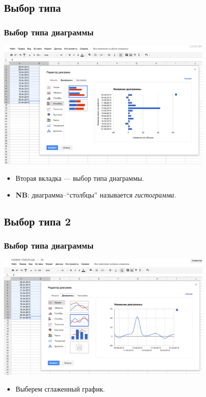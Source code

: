 \documentclass[compress,red]{beamer}
\begin{document}
\subsection{Выбор типа}
\begin{frame}[fragile]
  \frametitle{Выбор типа диаграммы}
  \centerline{\includegraphics[width=0.8\textwidth]{images/03.png}}
  \begin{itemize}
      \item Вторая вкладка --- выбор типа диаграммы.
      \item \textbf{NB}: диаграмма--``столбцы'' называется \emph{гистограмма}.
  \end{itemize}
\end{frame}

\subsection{Выбор типа 2}
\begin{frame}[fragile]
  \frametitle{Выбор типа диаграммы}
  \centerline{\includegraphics[width=0.8\textwidth]{images/03-2.png}}
  \begin{itemize}
      \item Выберем сглаженный график.
  \end{itemize}
\end{frame}
\end{document}
